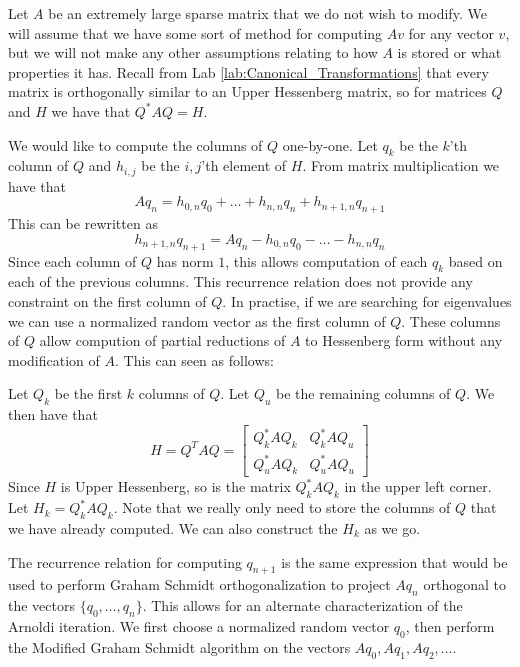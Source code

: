 Let $A$ be an extremely large sparse matrix that we do not wish to modify.
We will assume that we have some sort of method for computing $A v$ for any vector $v$, but we will not make any other assumptions relating to how $A$ is stored or what properties it has.
Recall from Lab \ref{lab:Canonical_Transformations} that every matrix is orthogonally similar to an Upper Hessenberg matrix, so for matrices $Q$ and $H$ we have that $Q^* A Q = H$.

We would like to compute the columns of $Q$ one-by-one.
Let $q_k$ be the $k$'th column of $Q$ and $h_{i,j}$ be the $i,j$'th element of $H$.
From matrix multiplication we have that 
\[A q_n = h_{0, n} q_0 + \dots + h_{n, n} q_n + h_{n+1, n} q_{n+1}\]
This can be rewritten as
\[h_{n+1, n} q_{n+1} = A q_n - h_{0,n} q_0 - \dots - h_{n,n} q_n\]
Since each column of $Q$ has norm $1$, this allows computation of each $q_k$ based on each of the previous columns.
This recurrence relation does not provide any constraint on the first column of $Q$.
In practise, if we are searching for eigenvalues we can use a normalized random vector as the first column of $Q$.
These columns of $Q$ allow compution of partial reductions of $A$ to Hessenberg form without any modification of $A$.
This can seen as follows:

Let $Q_k$ be the first $k$ columns of $Q$.
Let $Q_u$ be the remaining columns of $Q$.
We then have that
\[H = Q^T A Q =
\begin{bmatrix}
Q_k^* A Q_k & Q_k^* A Q_u \\
Q_u^* A Q_k & Q_u^* A Q_u
\end{bmatrix}\]
Since $H$ is Upper Hessenberg, so is the matrix $Q_k^* A Q_k$ in the upper left corner.
Let $H_k = Q_k^* A Q_k$.
Note that we really only need to store the columns of $Q$ that we have already computed.
We can also construct the $H_k$ as we go.

\begin{info}
The recurrence relation for computing $q_{n+1}$ is the same expression that would be used to perform Graham Schmidt orthogonalization to project $A q_n$ orthogonal to the vectors $\{ q_0, \dots, q_n \}$.
This allows for an alternate characterization of the Arnoldi iteration.
We first choose a normalized random vector $q_0$, then perform the Modified Graham Schmidt algorithm on the vectors $A q_0, A q_1, A q_2, \dots$.
\end{info}


